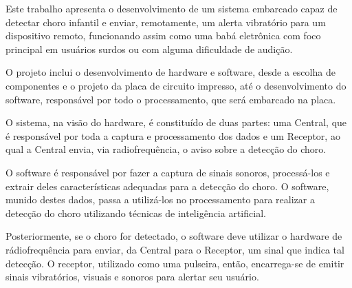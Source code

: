 \documentclass[a4paper, 12pt]{article}
\begin{document}
		Este trabalho apresenta o desenvolvimento de um sistema embarcado capaz de detectar choro infantil e enviar, remotamente, um alerta vibratório para um dispositivo remoto, funcionando assim como uma babá eletrônica com foco principal em usuários surdos ou com alguma dificuldade de audição.
			
		O projeto inclui o desenvolvimento de hardware e software, desde a escolha de componentes e o projeto da placa de circuito impresso, até o desenvolvimento do software, responsável por todo o processamento, que será embarcado na placa.
		 
		O sistema, na visão do hardware, é constituído de duas partes: uma Central, que é responsável por toda a captura e processamento dos dados e um Receptor, ao qual a Central envia, via radiofrequência, o aviso sobre a detecção do choro.
		
		O software é responsável por fazer a captura de sinais sonoros, processá-los e extrair deles características adequadas para a detecção do choro. O software, munido destes dados, passa a utilizá-los no processamento para realizar a detecção do choro utilizando técnicas de inteligência artificial.
		
		Posteriormente, se o choro for detectado, o software deve utilizar o hardware de rádiofrequência para enviar, da Central para o Receptor, um sinal que indica tal detecção. O receptor, utilizado como uma pulseira, então, encarrega-se de emitir sinais vibratórios, visuais e sonoros para alertar seu usuário.
		\newpage
\end{document}
